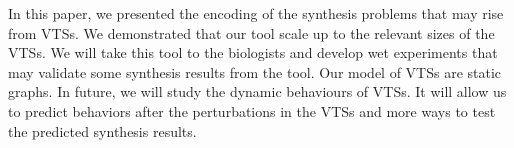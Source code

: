 In this paper, we presented the encoding of the synthesis problems
that may rise from VTSs.
%
We demonstrated that our tool scale up to the relevant sizes of the
VTSs. 
%
We will take this tool to the biologists and develop wet experiments 
that may validate some synthesis results from the tool.
%
Our model of VTSs are static graphs.
%
In future, we will study the dynamic behaviours of VTSs.
%
It will allow us to predict behaviors after the perturbations in the VTSs
and more ways to test the predicted synthesis results.

